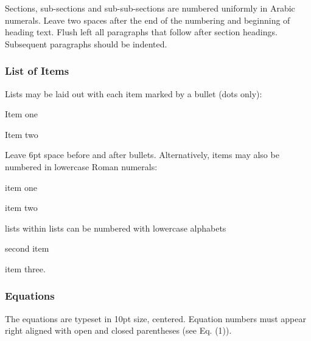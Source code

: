 \documentclass[twocolumn]{rps-esrel2026}
\begin{document}
Sections, sub-sections and sub-sub-sections are numbered uniformly in Arabic numerals.  Leave two spaces after the end of the numbering and beginning of
heading text. Flush left all paragraphs that follow after section headings.  Subsequent paragraphs should be indented.

\subsubsection{List of Items}

Lists may be laid out with each item marked by a bullet (dots only):

\begin{itemlist}

\item{}  Item one
\item{}  Item two

\end{itemlist}

Leave 6pt space before and after bullets.  Alternatively, items may also be numbered in lowercase Roman numerals:\cite{sample3}


\begin{romanlist}[(iii)]

\item{} item one
\item{} item two

\begin{alphlist}[(b)]
\item  lists within lists can be numbered with lowercase alphabets
\item  second item
\end{alphlist}


\item{} item three.
\end{romanlist}

 
\subsubsection{Equations}

The equations are typeset in 10pt size, centered.  Equation numbers must appear right aligned with open and closed parentheses (see Eq. (1)).
\end{document}
